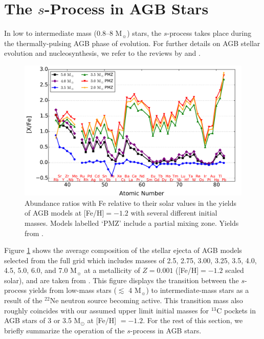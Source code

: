 \section{The $s$-Process in AGB Stars}\label{sec:agbsprocess}

In low to intermediate mass (0.8--8 M$_\sun$) stars, the $s$-process takes place during the thermally-pulsing AGB phase of evolution. For further details on AGB stellar evolution and nucleosynthesis, we refer to the reviews by \citet{Herwig:2005jn} and \citet{Karakas:2014jt}.

\begin{figure}
 \begin{center}\includegraphics[width=\textwidth]{f2.pdf}\end{center}
 \caption{Abundance ratios with Fe relative to their solar values in the yields of AGB models at [Fe/H]$=-1.2$ with several different initial masses. Models labelled `PMZ' include a partial mixing zone. Yields from \citet{Fishlock:2014jq}.}
 \label{fig:agbyields}
\end{figure}

Figure \ref{fig:agbyields} shows the average composition of the stellar ejecta of AGB models selected from the full grid which includes masses of 2.5, 2.75, 3.00, 3.25, 3.5, 4.0, 4.5, 5.0, 6.0, and 7.0 M$_\sun$ at a metallicity of $Z=0.001$ ([Fe/H]$=-1.2$ scaled solar), and are taken from \citet{Fishlock:2014jq}. This figure displays the transition between the $s$-process yields from low-mass stars ($\lesssim$ 4 M$_\sun$) to intermediate-mass stars as a result of the $^{22}$Ne neutron source becoming active. This transition mass also roughly coincides with our assumed upper limit initial masses for $^{13}$C pockets in AGB stars of 3 or 3.5 M$_\odot$ at [Fe/H] $=-1.2$. For the rest of this section, we briefly summarize the operation of the $s$-process in AGB stars.

